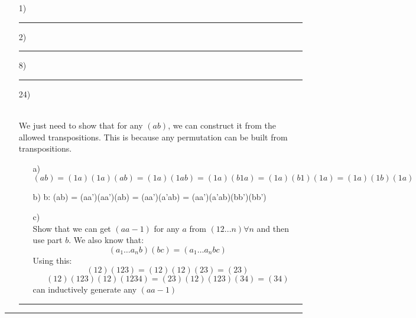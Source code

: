 \documentclass[11pt]{article}
\begin{document}
\begin{itemize}
    \item[1)] 
    \vspace{6pt}
    \hrule
    \vspace{6pt}
    \item[2)] 
    \vspace{6pt}
    \hrule
    \vspace{6pt}
    \item[8)]
    \vspace{6pt}
    \hrule
    \vspace{6pt}
    \item[24)]
    \begin{solution}\hfill \\
        We just need to show that for any $(ab)$, we can construct it from the allowed transpositions. This is because any permutation can be built from transpositions.
        \begin{itemize}
            \item[a)]
                $$(ab) = (1a)(1a)(ab) = (1a)(1ab) = (1a)(b1a) = (1a)(b1)(1a) = (1a)(1b)(1a)$$
            \item[b)]
                b:
                (ab) = (aa')(aa')(ab) = (aa')(a'ab) = (aa')(a'ab)(bb')(bb')
            \item[c)]\\
                Show that we can get $(a a-1)$ for any $a$ from $(12...n) \forall n$ and then use part $b$. We also know that:
                $$(a_1 \dots a_nb)(bc) = (a_1\dots a_nbc)$$
                Using this:
                $$(12)(123) = (12)(12)(23) = (23)$$
                $$(12)(123)(12)(1234) = (23)(12)(123)(34) = (34)$$
                can inductively generate any $(a a-1)$
        \end{itemize}
    \end{solution}
    \vspace{6pt}
    \hrule
    \vspace{6pt}
\end{itemize}
\vspace{6pt}
\hrule
\vspace{6pt}
\end{document}
